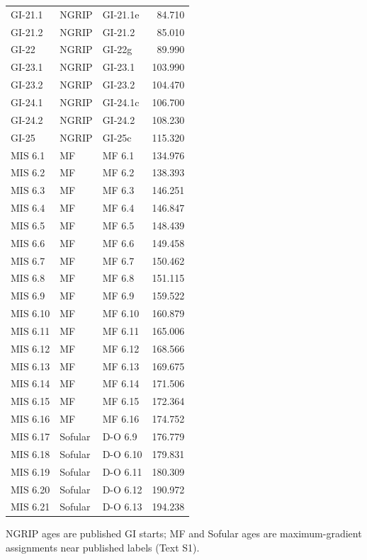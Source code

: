 {\begin{longtable}{lllr}
GI-21.1 & NGRIP & GI-21.1e & 84.710 \\
GI-21.2 & NGRIP & GI-21.2 & 85.010 \\
GI-22 & NGRIP & GI-22g & 89.990 \\
GI-23.1 & NGRIP & GI-23.1 & 103.990 \\
GI-23.2 & NGRIP & GI-23.2 & 104.470 \\
GI-24.1 & NGRIP & GI-24.1c & 106.700 \\
GI-24.2 & NGRIP & GI-24.2 & 108.230 \\
GI-25 & NGRIP & GI-25c & 115.320 \\
MIS 6.1 & MF & MF 6.1 & 134.976 \\
MIS 6.2 & MF & MF 6.2 & 138.393 \\
MIS 6.3 & MF & MF 6.3 & 146.251 \\
MIS 6.4 & MF & MF 6.4 & 146.847 \\
MIS 6.5 & MF & MF 6.5 & 148.439 \\
MIS 6.6 & MF & MF 6.6 & 149.458 \\
MIS 6.7 & MF & MF 6.7 & 150.462 \\
MIS 6.8 & MF & MF 6.8 & 151.115 \\
MIS 6.9 & MF & MF 6.9 & 159.522 \\
MIS 6.10 & MF & MF 6.10 & 160.879 \\
MIS 6.11 & MF & MF 6.11 & 165.006 \\
MIS 6.12 & MF & MF 6.12 & 168.566 \\
MIS 6.13 & MF & MF 6.13 & 169.675 \\
MIS 6.14 & MF & MF 6.14 & 171.506 \\
MIS 6.15 & MF & MF 6.15 & 172.364 \\
MIS 6.16 & MF & MF 6.16 & 174.752 \\
MIS 6.17 & Sofular & D-O 6.9 & 176.779 \\
MIS 6.18 & Sofular & D-O 6.10 & 179.831 \\
MIS 6.19 & Sofular & D-O 6.11 & 180.309 \\
MIS 6.20 & Sofular & D-O 6.12 & 190.972 \\
MIS 6.21 & Sofular & D-O 6.13 & 194.238 \\
\end{longtable}
}
NGRIP ages are published GI starts; MF and Sofular ages are maximum-gradient assignments near published labels (Text S1).
